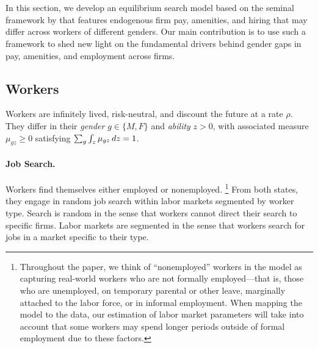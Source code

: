 

\section{{\sectionfour}\label{sec:Model}}

In this section, we develop an equilibrium search model based on the seminal framework by \citet{BurdettMortensen1998} that features endogenous firm pay, amenities, and hiring that may differ across workers of different genders. Our main contribution is to use such a framework to shed new light on the fundamental drivers behind gender gaps in pay, amenities, and employment across firms.


\subsection{Workers}

Workers are infinitely lived, risk-neutral, and discount the future at a rate $\rho$. They differ in their \emph{gender} $g \in \{M, F\}$ and \emph{ability} $z > 0$, with associated measure $\mu_{gz} \ge 0$ satisfying $\sum_{g} \int_{z} \mu_{gz} \mathop{}\!{d} z = 1$.


\paragraph{Job Search.}

Workers find themselves either employed or nonemployed.%
%
\footnote{Throughout the paper, we think of ``nonemployed'' workers in the model as capturing real-world workers who are not formally employed---that is, those who are unemployed, on temporary parental or other leave, marginally attached to the labor force, or in informal employment. When mapping the model to the data, our estimation of labor market parameters will take into account that some workers may spend longer periods outside of formal employment due to these factors.} %
%
From both states, they engage in random job search within labor markets segmented by worker type. Search is random in the sense that workers cannot direct their search to specific firms. Labor markets are segmented in the sense that workers search for jobs in a market specific to their type.

